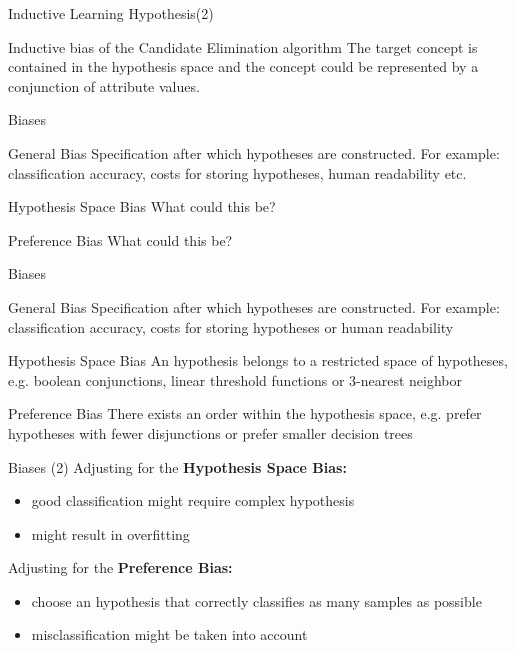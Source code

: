 \documentclass{beamer}
\begin{document}
\begin{frame}{Inductive Learning Hypothesis(2)}
\begin{block}{Inductive bias of the Candidate Elimination algorithm}
The target concept is contained in the hypothesis space and the concept could be represented by a conjunction of attribute values.
\end{block}
\end{frame}

\begin{frame}{Biases}

\begin{block}{General Bias}
Specification after which hypotheses are constructed. For example: classification accuracy, costs for storing hypotheses, human readability etc.
\end{block}

\begin{block}{Hypothesis Space Bias}
What could this be?
\end{block}

\begin{block}{Preference Bias}
What could this be?
\end{block}
\end{frame}


\begin{frame}{Biases}

\begin{block}{General Bias}
Specification after which hypotheses are constructed. For example: classification accuracy, costs for storing hypotheses or human readability
\end{block}

\begin{block}{Hypothesis Space Bias}
An hypothesis belongs to a restricted space of hypotheses, e.g. boolean conjunctions, linear threshold functions or 3-nearest neighbor
\end{block}

\begin{block}{Preference Bias}
There exists an order within the hypothesis space, e.g. prefer hypotheses with fewer disjunctions or prefer smaller decision trees
\end{block}
\end{frame}


\begin{frame}{Biases (2)}
Adjusting for the \textbf{Hypothesis Space Bias:}
\begin{itemize}
\item good classification might require complex hypothesis
\item might result in overfitting
\end{itemize}

Adjusting for the \textbf{Preference Bias:}
\begin{itemize}
\item choose an hypothesis that correctly classifies as many samples as possible
\item misclassification might be taken into account
\end{itemize}
\end{frame}
\end{document}
